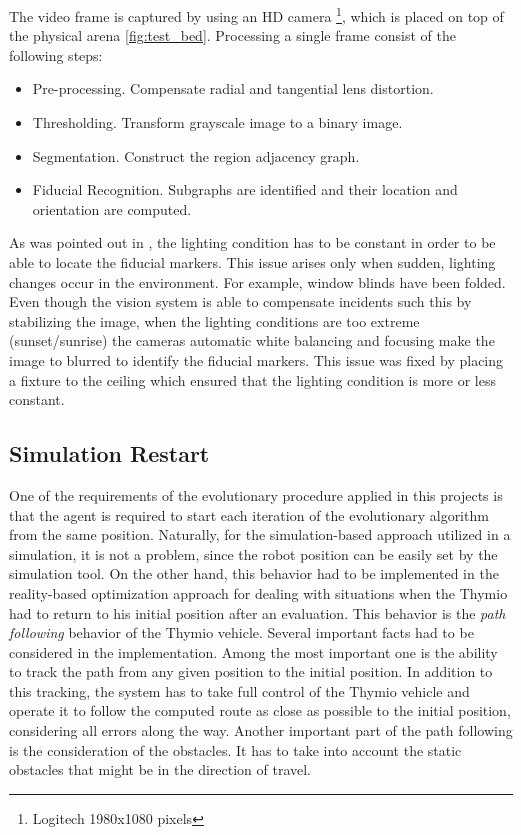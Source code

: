 The video frame is captured by using an HD camera \footnote{Logitech 1980x1080 pixels}, which is placed on top of the physical arena \ref{fig:test_bed}. Processing a single frame consist of the following steps: 

\begin{itemize}
  \item Pre-processing. Compensate radial and tangential lens distortion.
  \item Thresholding. Transform grayscale image to a binary image.
  \item Segmentation. Construct the region adjacency graph.
  \item Fiducial Recognition. Subgraphs are identified and their location and orientation are computed.   
\end{itemize}

As was pointed out in \citep{faina2017automating}, the lighting condition has to be constant in order to be able to locate the fiducial markers. This issue arises only when sudden, lighting changes occur in the environment. For example, window blinds have been folded. Even though the vision system is able to compensate incidents such this by stabilizing the image, when the lighting conditions are too extreme (sunset/sunrise) the cameras automatic white balancing and focusing make the image to blurred to identify the fiducial markers. This issue was fixed by placing a fixture to the ceiling which ensured that the lighting condition is more or less constant.


\subsection{Simulation Restart}

One of the requirements of the evolutionary procedure applied in this projects is that the agent is required to start each iteration of the evolutionary algorithm from the same position. Naturally, for the simulation-based approach utilized in a simulation, it is not a problem, since the robot position can be easily set by the simulation tool. On the other hand, this behavior had to be implemented in the reality-based optimization approach for dealing with situations when the Thymio had to return to his initial position after an evaluation. This behavior is the \emph{path following} behavior of the Thymio vehicle. Several important facts had to be considered in the implementation. Among the most important one is the ability to track the path from any given position to the initial position. In addition to this tracking, the system has to take full control of the Thymio vehicle and operate it to follow the computed route as close as possible to the initial position, considering all errors along the way. Another important part of the path following is the consideration of the obstacles. It has to take into account the static obstacles that might be in the direction of travel.

